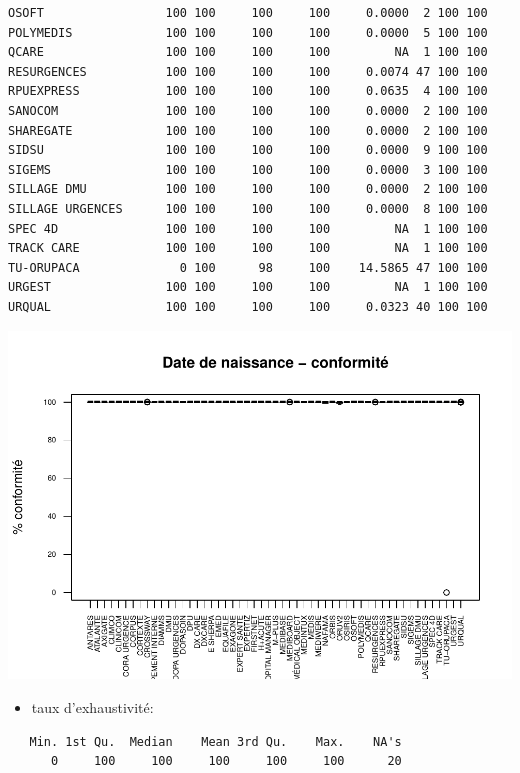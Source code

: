 \documentclass[]{article}
\providecommand{\tightlist}{%
  \setlength{\itemsep}{0pt}\setlength{\parskip}{0pt}}
\begin{document}
\begin{verbatim}
OSOFT                 100 100     100     100     0.0000  2 100 100
POLYMEDIS             100 100     100     100     0.0000  5 100 100
QCARE                 100 100     100     100         NA  1 100 100
RESURGENCES           100 100     100     100     0.0074 47 100 100
RPUEXPRESS            100 100     100     100     0.0635  4 100 100
SANOCOM               100 100     100     100     0.0000  2 100 100
SHAREGATE             100 100     100     100     0.0000  2 100 100
SIDSU                 100 100     100     100     0.0000  9 100 100
SIGEMS                100 100     100     100     0.0000  3 100 100
SILLAGE DMU           100 100     100     100     0.0000  2 100 100
SILLAGE URGENCES      100 100     100     100     0.0000  8 100 100
SPEC 4D               100 100     100     100         NA  1 100 100
TRACK CARE            100 100     100     100         NA  1 100 100
TU-ORUPACA              0 100      98     100    14.5865 47 100 100
URGEST                100 100     100     100         NA  1 100 100
URQUAL                100 100     100     100     0.0323 40 100 100
\end{verbatim}

\includegraphics{septembre2015_files/figure-latex/unnamed-chunk-20-1.pdf}

\begin{itemize}
\tightlist
\item
  taux d'exhaustivité:
\end{itemize}

\begin{verbatim}
   Min. 1st Qu.  Median    Mean 3rd Qu.    Max.    NA's 
      0     100     100     100     100     100      20 
\end{verbatim}
\end{document}
